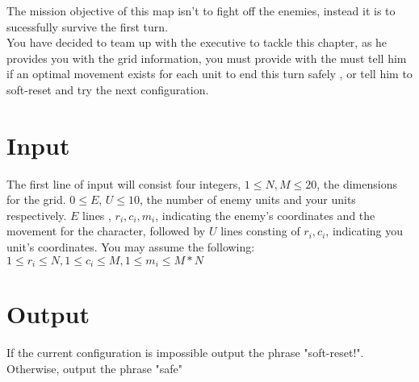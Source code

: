 \noindent The mission objective of this map isn't to fight off the enemies, instead it is to sucessfully survive the
first turn.\\

\noindent You have decided to team up with the executive to tackle this chapter, as he provides you with the grid
information, you must provide with the must tell him if an optimal movement exists for each unit to end this turn safely
, or tell him to soft-reset and try the next configuration. \\

\section*{Input}
The first line of input will consist four integers, $1 \leq N, M \leq 20$, the dimensions for the grid.
$0 \leq E ,\, U \leq 10$, the number of enemy units and your units respectively. $E$ lines , $r_i, c_i, m_i$, indicating
the enemy's coordinates and the movement for the character, followed by $U$ lines consting of $r_i, c_i$, indicating
 you unit's coordinates. You may assume the following: $1 \leq r_i \leq N, 1 \leq c_i \leq M, 1 \leq m_i \leq M*N$ \\

\section*{Output}
If the current configuration is impossible output the phrase "soft-reset!". Otherwise, output the phrase "safe"


